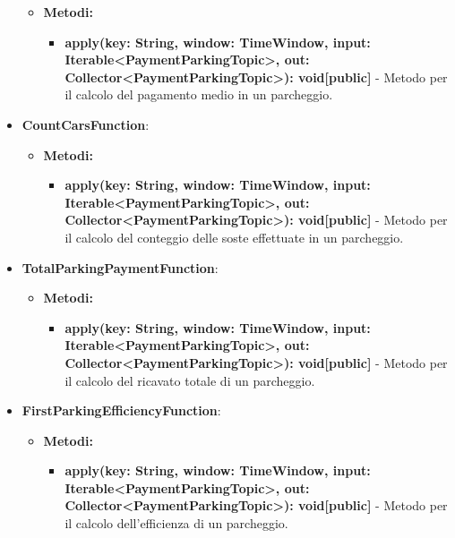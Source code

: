 \documentclass[8pt]{article}
\begin{document}
\begin{itemize}
\begin{itemize}
        \item \textbf{Metodi:}
        \begin{itemize}
	\setlength\itemsep{0em}
            \item \textbf{apply(key: String, window: TimeWindow, input: Iterable<PaymentParkingTopic>, out: Collector<PaymentParkingTopic>): void[public]} - Metodo per il calcolo del pagamento medio in un parcheggio.
        \end{itemize}
    \end{itemize}
    \item \textbf{CountCarsFunction}:
    \begin{itemize}
	\setlength\itemsep{0em}
        \item \textbf{Metodi:}
        \begin{itemize}
	\setlength\itemsep{0em}
            \item \textbf{apply(key: String, window: TimeWindow, input: Iterable<PaymentParkingTopic>, out: Collector<PaymentParkingTopic>): void[public]} - Metodo per il calcolo del conteggio delle soste effettuate in un parcheggio.
        \end{itemize}
    \end{itemize}
    \item \textbf{TotalParkingPaymentFunction}:
    \begin{itemize}
	\setlength\itemsep{0em}
        \item \textbf{Metodi:}
        \begin{itemize}
	\setlength\itemsep{0em}
            \item \textbf{apply(key: String, window: TimeWindow, input: Iterable<PaymentParkingTopic>, out: Collector<PaymentParkingTopic>): void[public]} - Metodo per il calcolo del ricavato totale di un parcheggio.
        \end{itemize}
    \end{itemize}
    \item \textbf{FirstParkingEfficiencyFunction}:
    \begin{itemize}
	\setlength\itemsep{0em}
        \item \textbf{Metodi:}
        \begin{itemize}
	\setlength\itemsep{0em}
            \item \textbf{apply(key: String, window: TimeWindow, input: Iterable<PaymentParkingTopic>, out: Collector<PaymentParkingTopic>): void[public]} - Metodo per il calcolo dell'efficienza di un parcheggio.
        \end{itemize}

\end{itemize}
\end{itemize}
\end{document}
